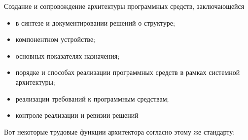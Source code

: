 \documentclass[a5paper]{article}
\begin{document}
{\ttfamily
Создание и сопровождение архитектуры программных средств, заключающейся 
	\begin{itemize}
		\item в синтезе и документировании решений о структуре;
		\item компонентном устройстве;
		\item основных показателях назначения; 
		\item порядке и способах реализации программных средств в рамках системной архитектуры; 
		\item реализации требований к программным средствам; 
		\item контроле реализации и ревизии решений
	\end{itemize}
}

Вот некоторые трудовые функции архитектора согласно этому же стандарту:
\end{document}
